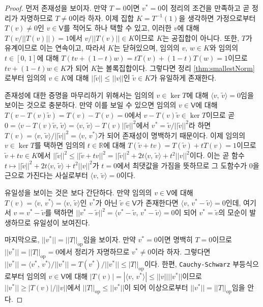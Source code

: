 \begin{proof}
    먼저 존재성을 보이자. 만약 $T=0$이면 $v^*=0$이 정리의 조건을 만족하고 곧 정리가 자명하므로 $T\ne0$이라 하자. 이제 집합 $K=T^{-1}(1)$을 생각하면 가정으로부터 $T(v)\ne0$인 $v\in\mathsf{V}$를 적어도 하나 택할 수 있고, 이러한 $v$에 대해 $T(v/||T(v)||)=1$에서 $v/||T(v)||\in K$이므로 $K$는 공집합이 아니다. 또한, $T$가 유계이므로 이는 연속이고, 따라서 $K$는 닫혀있으며, 임의의 $v,\,w\in K$와 임의의 $t\in[0,\,1]$에 대해 $T(tv+(1-t)w)=tT(v)+(1-t)T(w)=1$이므로 $tv+(1-t)w\in K$가 되어 $K$는 볼록집합이다. 그렇다면 정리 \ref{thm:smallestNorm}로부터 임의의 $v\in K$에 대해 $||\widetilde{v}||\leq||v||$인 $\widetilde{v}\in K$가 유일하게 존재한다.

    존재성에 대한 증명을 마무리하기 위해서는 임의의 $v\in\ker T$에 대해 $\langle v,\,\widetilde{v}\rangle=0$임을 보이는 것으로 충분하다. 만약 이를 보일 수 있으면 임의의 $v\in\mathsf{V}$에 대해 $T(v-T(v)\widetilde{v})=T(v)-T(v)=0$에서 $v-T(v)\widetilde{v}\in\ker T$이므로 곧 $0=\langle v-T(v)\widetilde{v},\,\widetilde{v}\rangle=\langle v,\,\widetilde{v}\rangle-T(v)||\widetilde{v}||^2$에서 $v^*=\widetilde{v}/||\widetilde{v}||^2$라 하면 $T(v)=\langle v,\,\widetilde{v}\rangle/||\widetilde{v}||^2=\langle v,\,v^*\rangle$가 되어 존재성이 명백하기 때문이다. 이제 임의의 $v\in\ker T$를 택하면 임의의 $t\in\mathbb{R}$에 대해 $T(\widetilde{v}+tv)=T(\widetilde{v})+tT(v)=1$이므로 $\widetilde{v}+tv\in K$에서 $||\widetilde{v}||^2\leq||\widetilde{v}+tv||^2=||\widetilde{v}||^2+2t\langle v,\,\widetilde{v}\rangle+t^2||v||^2$이다. 이는 곧 함수 $t\mapsto||\widetilde{v}||^2+2t\langle v,\,\widetilde{v}\rangle+t^2||v||^2$가 $t=0$에서 최댓값을 가짐을 뜻하므로 그 도함수가 $0$을 근으로 가진다는 사실로부터 $\langle v,\,\widetilde{v}\rangle=0$이다.

    유일성을 보이는 것은 보다 간단하다. 만약 임의의 $v\in\mathsf{V}$에 대해 $T(v)=\langle v,\,v^*\rangle=\langle v,\,\widetilde{v}\rangle$인 $v^*$가 아닌 $\widetilde{v}\in\mathsf{V}$가 존재한다면 $\langle v,\,v^*-\widetilde{v}\rangle=0$인데, 여기서 $v=v^*-\widetilde{v}$를 택하면 $||v^*-\widetilde{v}||^2=\langle v^*-\widetilde{v},\,v^*-\widetilde{v}\rangle=0$이 되어 $v^*=\widetilde{v}$의 모순이 발생하므로 유일성이 보여진다.

    마지막으로, $||v^*||=||T||_{\mathrm{op}}$임을 보이자. 만약 $v^*=0$이면 명백히 $T=0$이므로 $||v^*||=||T||_\mathrm{op}=0$에서 정리가 자명하므로 $v^*\ne0$이라 하자. 그렇다면 $||v^*||=\langle v^*,\,v^*\rangle/||v^*||=T(v^*)/||v^*||\leq|T||_\mathrm{op}$이다. 한편, \texttt{Cauchy-Schwarz} 부등식으로부터 임의의 $v\in\mathsf{V}$에 대해 $|T(v)|=|\langle v,\,v^*\rangle|\leq||v||||v^*||$이므로 $||v^*||\geq|T(v)|/||v||$에서 $||T||_\mathrm{op}\leq||v^*||$이 되어 이상으로부터 $||v^*||=||T||_{\mathrm{op}}$임을 안다.
\end{proof}

